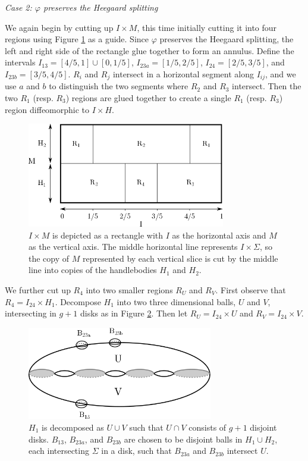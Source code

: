 \documentclass[12pt]{amsart}
\theoremstyle{definition}
\theoremstyle{remark}
\begin{document}
\smallskip
\noindent\textit{Case 2: $\varphi$ preserves the Heegaard splitting}\ \

We again begin by cutting up $I \times M$, this time initially cutting it into four regions using Figure \ref{preservebreakdown} as a guide.
Since $\varphi$ preserves the Heegaard splitting, the left and right side of the rectangle glue together to form an annulus.
Define the intervals $I_{13} = [4/5,1] \cup [0,1/5]$, $I_{23a} = [1/5,2/5]$, $I_{24} = [2/5,3/5]$, and $I_{23b} = [3/5,4/5]$.
$R_i$ and $R_j$ intersect in a horizontal segment along $I_{ij}$, and we use $a$ and $b$ to distinguish the two segments where $R_2$ and $R_3$ intersect.
Then the two $R_1$ (resp.
$R_3$) regions are glued together to create a single $R_1$ (resp.
$R_3$) region diffeomorphic to $I \times H$.


\begin{figure}[h]
\centering
\includegraphics[height=1.8in]{MxS1_preserves.png}
\caption{$I \times M$ is depicted as a rectangle with $I$ as the horizontal axis and $M$ as the vertical axis.
The middle horizontal line represents $I \times \Sigma$, so the copy of $M$ represented by each vertical slice is cut by the middle line into copies of the handlebodies $H_1$ and $H_2$.}
\label{preservebreakdown}
\end{figure}

We further cut up $R_4$ into two smaller regions $R_U$ and $R_V$.
First observe that $R_4 = I_{24} \times H_1$.
Decompose $H_1$ into two three dimensional balls, $U$ and $V$, intersecting in $g+1$ disks as in Figure \ref{fig_disjointballs}.
Then let $R_U = I_{24}  \times U$ and $R_V = I_{24} \times V$.


\begin{figure}[h]
\centering
\includegraphics[height=1.6in]{disjointballs.png}
\caption{$H_1$ is decomposed as $U \cup V$ such that $U \cap V$ consists of $g+1$ disjoint disks.
$B_{13}$, $B_{23a}$, and $B_{23b}$ are chosen to be disjoint balls in $H_1 \cup H_2$, each intersecting $\Sigma$ in a disk, such that $B_{23a}$ and $B_{23b}$ intersect $U$.}
\label{fig_disjointballs}
\end{figure}
\end{document}
